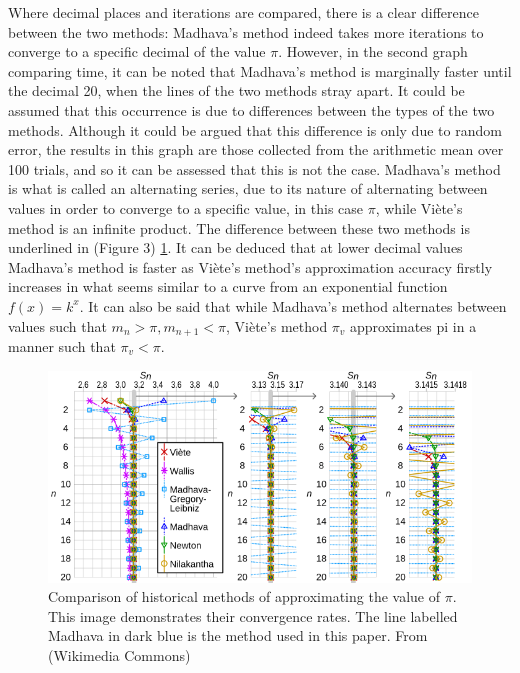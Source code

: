 Where decimal places and iterations are compared, there is a clear difference between the two
methods: Madhava's method indeed takes more iterations to converge to a specific decimal of
the value $\pi$. However, in the second graph comparing time, it can be noted that Madhava's
method is marginally faster until the decimal 20, when the lines of the two methods stray apart. It could be
assumed that this occurrence is due to differences between the types of the two methods. Although it 
could be argued that this difference is only due to random error, the results in this graph 
are those collected from the arithmetic mean over 100 trials, and so it can be assessed that this is not the case. Madhava's
method is what is called an alternating series, due to its nature of alternating between values in order
to converge to a specific value, in this case $\pi$, while Viète's method is an infinite product. The
difference between these two methods is underlined in (Figure 3) \ref{fig:comparaison}. It can be
deduced that at lower decimal values Madhava's method is faster as Viète's method's approximation
accuracy firstly increases in what seems similar to a curve from an exponential function $f(x) = k^x$.
It can also be said that while Madhava's method alternates between values such that $m_{n} > \pi, m_{n+1} < \pi$,
Viète's method $\pi_v$ approximates pi in a manner such that $\pi_v < \pi$.

\begin{figure}[h]
    \includegraphics[width=\linewidth]{image.png}
    \caption{Comparison of historical methods of approximating the value of $\pi$. This image demonstrates
        their convergence rates. The line labelled Madhava in dark blue is the method used in this paper.
        From (Wikimedia Commons) \cite{infinite_series_comparaison}}
    \label{fig:comparaison}
\end{figure}
